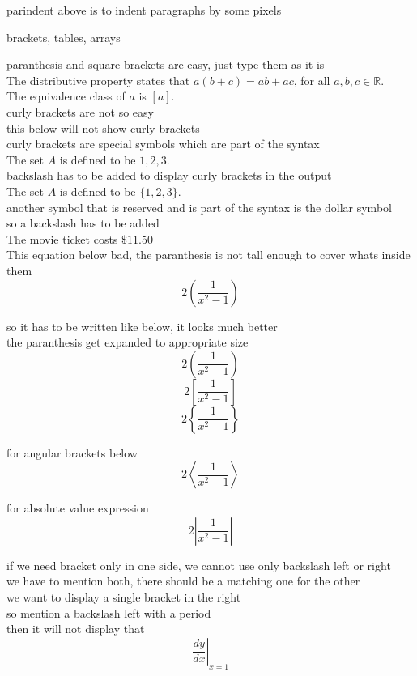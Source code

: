 \documentclass[24pt]{article}
\begin{document}
parindent above is to indent paragraphs by some pixels

brackets, tables, arrays

paranthesis and square brackets are easy, just type them as it is\\

The distributive property states that $a(b+c)=ab+ac$, for all $a, b, c \in \mathbb{R}$.\\[6pt]
The equivalence class of $a$ is $[a]$.\\

curly brackets are not so easy\\

this below will not show curly brackets\\
curly brackets are special symbols which are part of the syntax\\
The set $A$ is defined to be ${1, 2, 3}$.\\[6pt]

backslash has to be added to display curly brackets in the output\\
The set $A$ is defined to be $\{1, 2, 3\}$.\\[6pt]

another symbol that is reserved and is part of the syntax is the dollar symbol\\
so a backslash has to be added\\
The movie ticket costs $\$11.50$\\[6pt]

This equation below bad, the paranthesis is not tall enough to cover whats inside them\\
$$2(\frac{1}{x^2-1})$$

so it has to be written like below, it looks much better\\
the paranthesis get expanded to appropriate size\\
$$2\left(\frac{1}{x^2-1}\right)$$
$$2\left[\frac{1}{x^2-1}\right]$$
$$2\left\{\frac{1}{x^2-1}\right\}$$

for angular brackets below
$$2\left \langle   \frac{1}{x^2-1}\right  \rangle  $$

for absolute value expression
$$2\left  |   \frac{1}{x^2-1}\right  |  $$

if we need bracket only in one side, we cannot use only backslash left or right\\
we have to mention both, there should be a matching one for the other\\
we want to display a single bracket in the right\\
so mention a backslash left with a period\\
then it will not display that\\
$$\left.  \frac{dy}{dx}\right | _{x=1}$$
\end{document}
